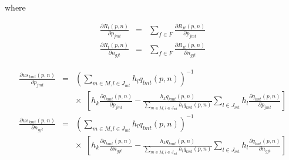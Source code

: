 \documentclass[12pt]{article}
\begin{document}
		\vspace{-0.1in}			
			
\noindent where			
	
\vspace{-0.4in}	

	


	\begin{eqnarray*}
	\frac{\partial R_t(\textit{p},\textit{n})}{\partial p_{jmt}} &=& \sum_{f \in F} \frac{\partial R_{ft}(\textit{p},\textit{n})}{\partial p_{jmt}} \\
	\frac{\partial R_t(\textit{p},\textit{n})}{\partial n_{gjt}} &=& \sum_{f \in F} \frac{\partial R_{ft}(\textit{p},\textit{n})}{\partial n_{gjt}}
	\end{eqnarray*}


	
\vspace{-0.4in}	

	\begin{eqnarray*}
	\frac{ \partial us_{kmt}(\textit{p},\textit{n})}{\partial p_{jmt}} 
	&=& \left(\sum_{m\in M,l \in J_{mt}} h_l q_{lmt}(\textit{p},\textit{n}) \right)^{-1}  \\ && \times \,\,\, \left[h_k \frac{\partial q_{kmt}(\textit{p},\textit{n})}{\partial p_{jmt}} - \frac{h_k q_{kmt}(\textit{p},\textit{n})}{\sum_{m\in M,l \in J_{mt}} h_l q_{lmt}(\textit{p},\textit{n})}  \sum_{l \in J_{mt}} h_l \frac{\partial q_{lmt}(\textit{p},\textit{n})}{\partial p_{jmt} } \right] \\
	\frac{ \partial us_{kmt}(\textit{p},\textit{n})}{\partial n_{gjt}} 
	&=& \left(\sum_{m\in M,l \in J_{mt}} h_l q_{lmt}(\textit{p},\textit{n}) \right)^{-1}  \\ && \times \,\,\, \left[h_k \frac{\partial q_{kmt}(\textit{p},\textit{n})}{\partial n_{gjt}} - \frac{h_k q_{kmt}(\textit{p},\textit{n})}{\sum_{m\in M,l \in J_{mt}} h_l q_{lmt}(\textit{p},\textit{n})}  \sum_{l \in J_{mt}} h_l \frac{\partial q_{lmt}(\textit{p},\textit{n})}{\partial n_{gjt} } \right]
	\end{eqnarray*}	


\vspace{-0.4in}	
\end{document}
